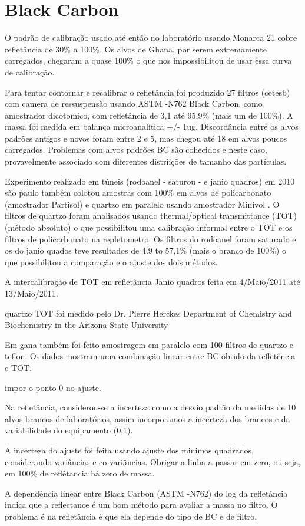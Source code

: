 \section{Black Carbon}

O padrão de calibração usado até então no laboratório usando Monarca 21 cobre refletância de 30\% a 100\%. 
Os alvos de Ghana, por serem extremamente carregados, chegaram a quase 100\% o que nos impossibilitou de usar 
essa curva de calibração.  



Para tentar contornar e recalibrar o refletância foi produzido 27 filtros (cetesb) com camera de ressuspensão
usando ASTM -N762 Black Carbon, como amostrador dicotomico, com refletância de 3,1 até 95,9\% (mais um de 100\%).
A massa foi medida em balança microanalítica +/- 1ug.
Discordância entre os alvos padrões antigos e novos foram entre 2 e 5, mas chegou 
até 18 em alvos poucos carregados. Problemas com alvos padrões BC são cohecidos e 
neste caso, provavelmente associado com diferentes distriições de tamanho das partículas.

Experimento realizado em túneis (rodoanel - saturou - e janio quadros) em 2010 são paulo também colotou amostras com 100\%
em alvos de policarbonato (amostrador Partisol)  e quartzo em paralelo usando amostrador Minivol . 
O filtros de quartzo foram analisados usando thermal/optical transmittance (TOT) (método absoluto) o que
possibilitou uma calibração informal entre o TOT e os filtros de policarbonato na repletometro. 
Os filtros do rodoanel foram saturado e os do janio quados teve resultados de 4.9 to 57,1\% (mais o branco de 100\%)
o que possibilitou a comparação e o ajuste dos dois métodos.  

A intercalibração de TOT em refletância Janio quadros feita em 4/Maio/2011 até 13/Maio/2011.

quartzo TOT foi medido pelo Dr. Pierre Herckes
Department of Chemistry and Biochemistry in the Arizona State University


Em gana também foi feito amostragem em paralelo com 100 filtros de quartzo e teflon. 
Os dados mostram uma combinação linear entre BC obtido da refletência e TOT. 

impor o ponto 0 no ajuste.

Na refletância, considerou-se a incerteza como a desvio padrão da medidas de 10 alvos brancos de laboratórios, 
assim incorporamos a incerteza dos brancos e da variabilidade do equipamento  (0,1). 

A incerteza do ajuste foi feita usando ajuste dos minimos quadrados, considerando
variâncias e co-variâncias. 
Obrigar a linha a passar em zero, ou seja, em 100\% de reflêtancia há zero de massa. 

A dependência linear entre Black Carbon (ASTM -N762) do log da refletância indica
que a reflectance é um bom método para avaliar a massa no filtro. 
O problema é na refletância é que ela depende do tipo de BC e de filtro. 
  


